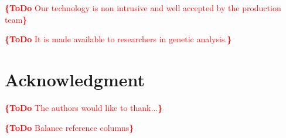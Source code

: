 \documentclass[conference]{IEEEtran}
\newcommand{\todo}[1]{\noindent\textcolor{red}{{\bf \{ToDo} #1{\bf \}}}}
\begin{document}
\todo{Our technology is non intrusive and well accepted by the production team}

\todo{It is made available to researchers in genetic analysis.}

 

\section*{Acknowledgment}

\todo{The authors would like to thank...}

\todo{Balance reference columns}







\end{document}
